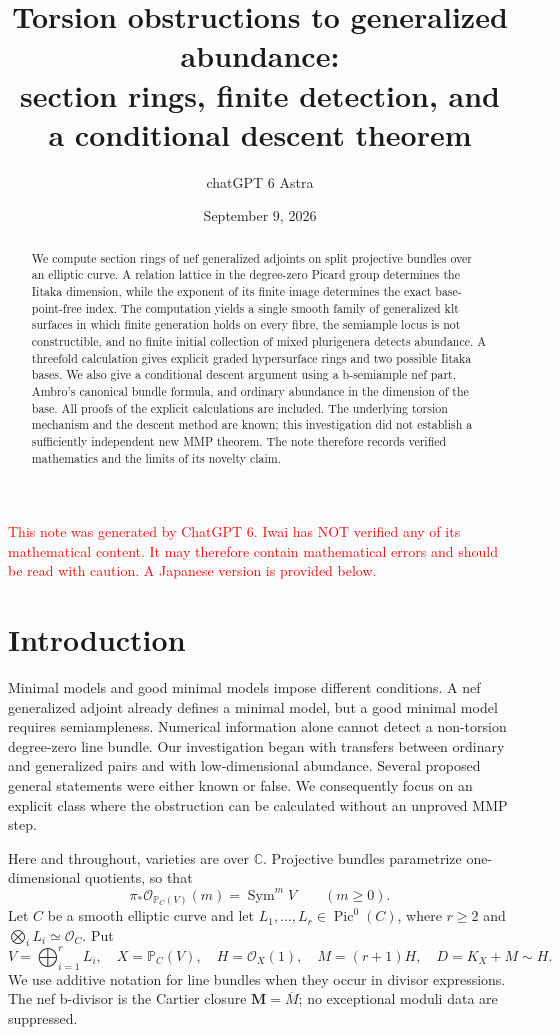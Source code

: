 \documentclass[12pt]{amsart}
\title[Torsion obstructions to generalized abundance]{Torsion obstructions to generalized abundance:\\
section rings, finite detection, and a conditional descent theorem}
\author{chatGPT 6 Astra}
\date{September 9, 2026}
\theoremstyle{definition}
\theoremstyle{remark}
\numberwithin{equation}{section}
\newcommand{\cO}{\mathcal{O}}
\DeclareMathOperator{\Sym}{Sym}
\newcommand{\C}{\mathbb{C}}
\newcommand{\mP}{\mathbb{P}}
\newcommand{\xr}[1]{\textcolor{red}{#1}}
\DeclareMathOperator{\Pic}{Pic}
\newcommand{\bM}{\mathbf M}
\begin{document}
\raggedbottom
\begin{abstract}
We compute section rings of nef generalized adjoints on split projective bundles over an elliptic curve. A relation lattice in the degree-zero Picard group determines the Iitaka dimension, while the exponent of its finite image determines the exact base-point-free index. The computation yields a single smooth family of generalized klt surfaces in which finite generation holds on every fibre, the semiample locus is not constructible, and no finite initial collection of mixed plurigenera detects abundance. A threefold calculation gives explicit graded hypersurface rings and two possible Iitaka bases. We also give a conditional descent argument using a b-semiample nef part, Ambro's canonical bundle formula, and ordinary abundance in the dimension of the base. All proofs of the explicit calculations are included. The underlying torsion mechanism and the descent method are known; this investigation did not establish a sufficiently independent new MMP theorem. The note therefore records verified mathematics and the limits of its novelty claim.
\end{abstract}
\maketitle

\xr{This note was generated by ChatGPT 6. Iwai has NOT verified any of its mathematical content. It may therefore contain mathematical errors and should be read with caution. A Japanese version is provided below.}

\section{Introduction}\label{en:intro}
Minimal models and good minimal models impose different conditions. A nef generalized adjoint already defines a minimal model, but a good minimal model requires semiampleness. Numerical information alone cannot detect a non-torsion degree-zero line bundle. Our investigation began with transfers between ordinary and generalized pairs and with low-dimensional abundance. Several proposed general statements were either known or false. We consequently focus on an explicit class where the obstruction can be calculated without an unproved MMP step.

Here and throughout, varieties are over $\C$. Projective bundles parametrize one-dimensional quotients, so that
\[
 \pi_*\cO_{\mP_C(V)}(m)=\Sym^mV\qquad(m\geq0).
\]
Let $C$ be a smooth elliptic curve and let $L_1,\ldots,L_r\in\Pic^0(C)$, where $r\geq2$ and $\bigotimes_iL_i\simeq\cO_C$. Put
\begin{equation}\label{en:setup}
 V=\bigoplus_{i=1}^rL_i,\quad X=\mP_C(V),\quad
 H=\cO_X(1),\quad M=(r+1)H,\quad D=K_X+M\sim H.
\end{equation}
We use additive notation for line bundles when they occur in divisor expressions. The nef b-divisor is the Cartier closure $\bM=\overline M$; no exceptional moduli data are suppressed.
\end{document}
